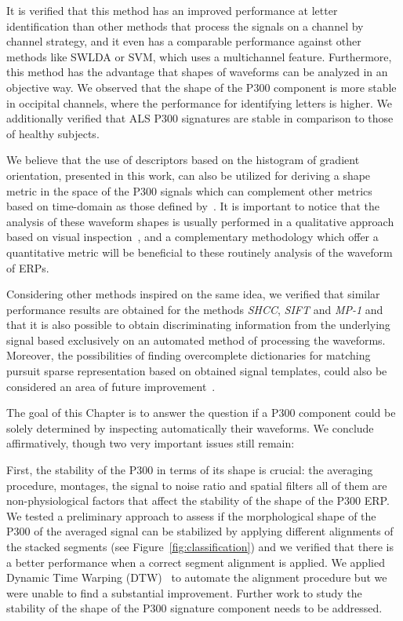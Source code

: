 It is verified that this method has an improved performance at letter identification than other methods that process the signals on a channel by channel strategy, and it even has a comparable performance against other methods like SWLDA or SVM, which uses a multichannel feature.
Furthermore, this method has the advantage that shapes of waveforms can be analyzed in an objective way.  We observed that the shape of the P300 component is more stable in occipital channels, where the performance for identifying letters is higher.   We additionally verified that ALS P300 signatures are stable in comparison to those of healthy subjects.


We believe that the use of descriptors based on the histogram of gradient orientation, presented in this work, can also be utilized for deriving a shape metric in the space of the P300 signals which can complement other metrics based on time-domain as those defined by~\cite{Mak2012}. It is important to notice that the analysis of these waveform shapes is usually performed in a qualitative approach based on visual inspection~\cite{SellersandEmanuelDonchin2006}, and a complementary methodology which offer a quantitative metric will be beneficial to these routinely analysis of the waveform of ERPs.


Considering other methods inspired on the same idea, we verified that similar performance results are obtained for the methods \textit{SHCC}, \textit{SIFT} and \textit{MP-1} and that it is also possible to obtain discriminating information from the underlying signal based exclusively on an automated method of processing the waveforms.  Moreover, the possibilities of finding overcomplete dictionaries for matching pursuit sparse representation based on obtained signal templates, could also be considered an area of future improvement~\cite{Gribonval2008}.

The goal of this Chapter is to answer the question if a P300 component could be solely determined by inspecting automatically their waveforms.  We conclude affirmatively, though two very important issues still remain:

First, the stability of the P300 in terms of its shape is crucial: the averaging procedure, montages, the signal to noise ratio and spatial filters all of them are non-physiological factors that affect the stability of the shape of the P300 ERP.  We tested a preliminary approach to assess if the morphological shape of the P300 of the averaged signal can be stabilized by applying different alignments of the stacked segments (see Figure~\ref{fig:classification}) and we verified that there is a better performance when a correct segment alignment is applied.  We applied Dynamic Time Warping (DTW)~\cite{Casarotto2005} to automate the alignment procedure but we were unable to find a substantial improvement.  Further work to study the stability of the shape of the P300 signature component needs to be addressed.

